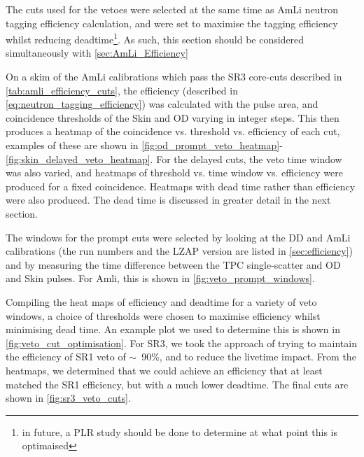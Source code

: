 The cuts used for the vetoes were selected at the same time as AmLi neutron tagging efficiency calculation, and were set to maximise the tagging efficiency whilst reducing deadtime\footnote{in future, a PLR study should be done to determine at what point this is optimaised}.
As such, this section should be considered simultaneously with \autoref{sec:AmLi_Efficiency}

On a skim of the AmLi calibrations which pass the SR3 core-cuts described in \autoref{tab:amli_efficiency_cuts}, the efficiency (described in \autoref{eq:neutron_tagging_efficiency}) was calculated with the pulse area, and coincidence thresholds of the Skin and OD varying in integer steps.
This then produces a heatmap of the coincidence vs. threshold vs. efficiency of each cut, examples of these are shown in \autoref{fig:od_prompt_veto_heatmap}-\ref{fig:skin_delayed_veto_heatmap}. 
For the delayed cuts, the veto time window was also varied, and heatmaps of threshold vs. time window vs. efficiency were produced for a fixed coincidence. Heatmaps with dead time rather than efficiency were also produced. The dead time is discussed in greater detail in the next section. 

The windows for the prompt cuts were selected by looking at the DD and AmLi calibrations (the run numbers and the LZAP version are listed in \autoref{sec:efficiency}) and by measuring the time difference between the TPC single-scatter and OD and Skin pulses.
For Amli, this is shown in \autoref{fig:veto_prompt_windows}.

Compiling the heat maps of efficiency and deadtime for a variety of veto windows, a choice of thresholds were chosen to maximise efficiency whilst minimising dead time.
An example plot we used to determine this is shown in \autoref{fig:veto_cut_optimisation}.
For SR3, we took the approach of trying to maintain the efficiency of SR1 veto of $\sim$~90\%, and to reduce the livetime impact.
From the heatmaps, we determined that we could achieve an efficiency that at least matched the SR1 efficiency, but with a much lower deadtime.
The final cuts are shown in \autoref{fig:sr3_veto_cuts}.

